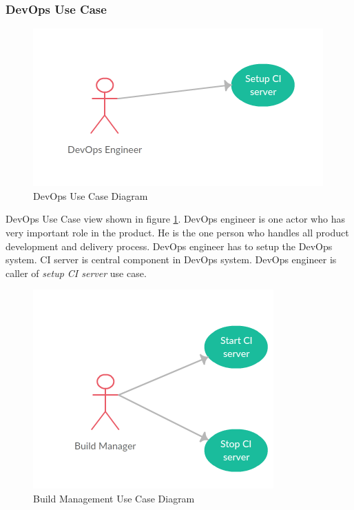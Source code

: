 \documentclass[a4paper,oneside,1,english1pt]{report}
\begin{document}
\subsubsection{DevOps Use Case}
\begin{figure}[h]
	\includegraphics[width=\linewidth]{diagrams/DevOpsUseCase.png}
	\caption{DevOps Use Case Diagram}
	\label{fig:devops_use_case_dia}
\end{figure}
DevOps Use Case view shown in figure \ref{fig:devops_use_case_dia}. DevOps engineer is one actor who has very important role in the product. He is the one person who handles all product development and delivery process. DevOps engineer has to setup the DevOps system. \ac{CI} server is central component in DevOps system. DevOps engineer is caller of  \textit{setup \ac{CI} server} use case.


\begin{figure}[h]
	\includegraphics[width=\linewidth]{diagrams/BuildManagementUseCase.png}
	\caption{Build Management Use Case Diagram}
	\label{fig:buildmanagement_use_case_dia}
\end{figure}
\end{document}
